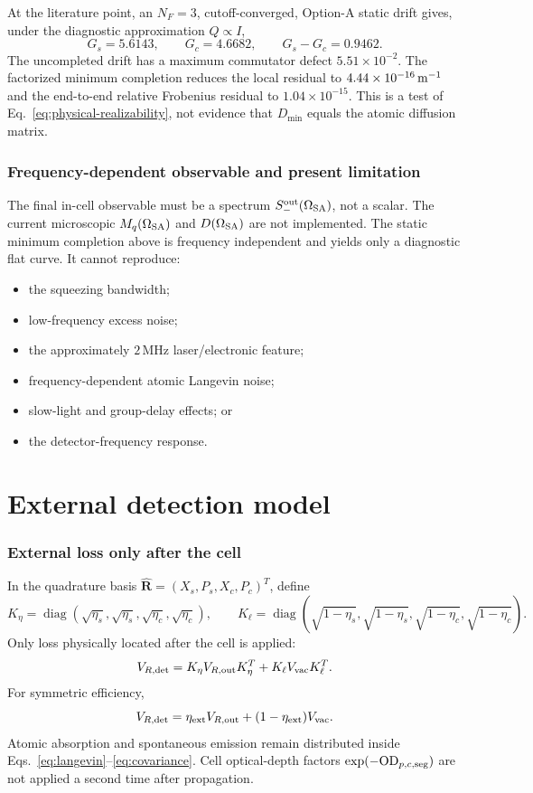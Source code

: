 \documentclass[11pt,a4paper]{article}
\newcommand{\MHz}{\,\mathrm{MHz}}
\begin{document}
At the literature point, an $N_F=3$, cutoff-converged, Option-A static drift
gives, under the diagnostic approximation $Q\propto I$,
\[
G_s=5.6143,\qquad G_c=4.6682,\qquad G_s-G_c=0.9462 .
\]
The uncompleted drift has a maximum commutator defect $5.51\times10^{-2}$.
The factorized minimum completion reduces the local residual to
$4.44\times10^{-16}\,{\rm m^{-1}}$ and the end-to-end relative Frobenius
residual to $1.04\times10^{-15}$. This is a test of
Eq.~\eqref{eq:physical-realizability}, not evidence that $D_{\min}$ equals the
atomic diffusion matrix.

\section{Frequency-dependent observable and present limitation}

The final in-cell observable must be a spectrum
$S_-^{\rm out}(\Omega_{\rm SA})$, not a scalar. The current microscopic
$M_q(\Omega_{\rm SA})$ and $D(\Omega_{\rm SA})$ are not implemented. The
static minimum completion above is frequency independent and yields only a
diagnostic flat curve. It cannot reproduce:
\begin{itemize}
\item the squeezing bandwidth;
\item low-frequency excess noise;
\item the approximately $2\MHz$ laser/electronic feature;
\item frequency-dependent atomic Langevin noise;
\item slow-light and group-delay effects; or
\item the detector-frequency response.
\end{itemize}

\part{External detection model}

\section{External loss only after the cell}

In the quadrature basis
$\hat{\bm R}=(X_s,P_s,X_c,P_c)^T$, define
\[
K_\eta=\operatorname{diag}(\sqrt{\eta_s},\sqrt{\eta_s},
\sqrt{\eta_c},\sqrt{\eta_c}),\qquad
K_\ell=\operatorname{diag}(\sqrt{1-\eta_s},\sqrt{1-\eta_s},
\sqrt{1-\eta_c},\sqrt{1-\eta_c}).
\]
Only loss physically located after the cell is applied:
\begin{equation}
V_{R,\rm det}=K_\eta V_{R,\rm out}K_\eta^T
+K_\ell V_{\rm vac}K_\ell^T .
\label{eq:detection-loss}
\end{equation}
For symmetric efficiency,
\[
V_{R,\rm det}=\eta_{\rm ext}V_{R,\rm out}
+(1-\eta_{\rm ext})V_{\rm vac}.
\]
Atomic absorption and spontaneous emission remain distributed inside
Eqs.~\eqref{eq:langevin}--\eqref{eq:covariance}. Cell optical-depth factors
$\exp(-{\rm OD}_{p,c,\rm seg})$ are not applied a second time after
propagation.
\end{document}
